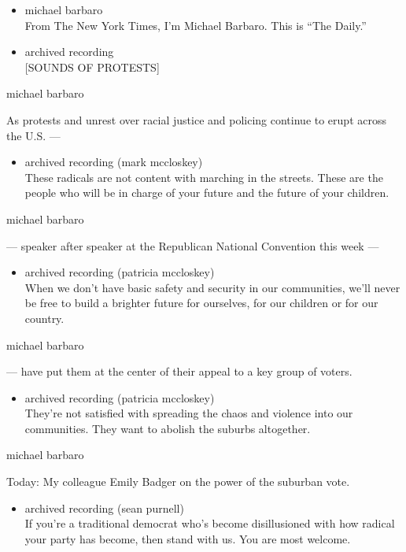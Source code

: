 \begin{itemize}
\item
  michael barbaro\\
  From The New York Times, I'm Michael Barbaro. This is ``The Daily.''
\item
  archived recording\\
  {[}SOUNDS OF PROTESTS{]}
\end{itemize}

michael barbaro

As protests and unrest over racial justice and policing continue to
erupt across the U.S. ---

\begin{itemize}
\tightlist
\item
  archived recording (mark mccloskey)\\
  These radicals are not content with marching in the streets. These are
  the people who will be in charge of your future and the future of your
  children.
\end{itemize}

michael barbaro

--- speaker after speaker at the Republican National Convention this
week ---

\begin{itemize}
\tightlist
\item
  archived recording (patricia mccloskey)\\
  When we don't have basic safety and security in our communities, we'll
  never be free to build a brighter future for ourselves, for our
  children or for our country.
\end{itemize}

michael barbaro

--- have put them at the center of their appeal to a key group of
voters.

\begin{itemize}
\tightlist
\item
  archived recording (patricia mccloskey)\\
  They're not satisfied with spreading the chaos and violence into our
  communities. They want to abolish the suburbs altogether.
\end{itemize}

michael barbaro

Today: My colleague Emily Badger on the power of the suburban vote.

\begin{itemize}
\tightlist
\item
  archived recording (sean purnell)\\
  If you're a traditional democrat who's become disillusioned with how
  radical your party has become, then stand with us. You are most
  welcome.
\end{itemize}

